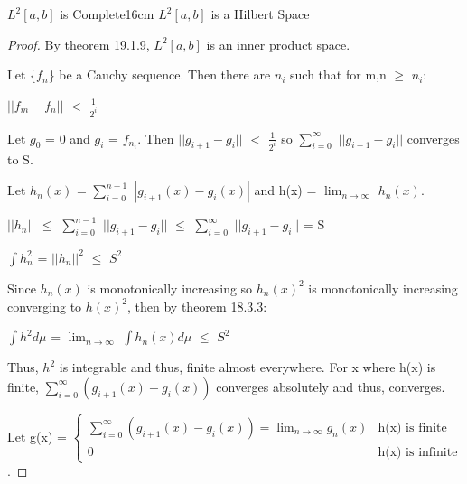     \newpage



    \begin{wtheorem}{$L^2[a,b]$ is Complete}{16cm}
        $L^2[a,b]$ is a Hilbert Space
    \end{wtheorem}

    \begin{proof}
        By {\color{red} theorem 19.1.9}, $L^2[a,b]$ is an inner product space.

        Let \{$f_n$\} be a Cauchy sequence.
        Then there are $n_i$ such that for m,n $\geq$ $n_i$:

        \hspace{0.5cm}
        $||f_m - f_n||$ $<$ $\frac{1}{2^i}$

        Let $g_0$ = 0 and $g_i$ = $f_{n_i}$.
        Then $||g_{i+1} - g_i||$ $<$ $\frac{1}{2^i}$
        so $\sum_{i=0}^{\infty}$ $||g_{i+1} - g_i||$ converges to S.

        Let $h_n(x)$ = $\sum_{i=0}^{n-1}$ $|g_{i+1}(x) - g_i(x)|$
        and h(x) = $\lim_{n \rightarrow \infty}$ $h_n(x)$.

        \hspace{0.5cm}
        $||h_n||$
        $\leq$ $\sum_{i=0}^{n-1}$ $||g_{i+1} - g_i||$
        $\leq$ $\sum_{i=0}^{\infty}$ $||g_{i+1} - g_i||$
        = S

        \hspace{0.5cm}
        $\int h_n^2$ = $||h_n||^2$ $\leq$ $S^2$

        Since $h_n(x)$ is monotonically increasing
        so $h_n(x)^2$ is monotonically increasing converging to $h(x)^2$,
        then by {\color{red} theorem 18.3.3}:

        \hspace{0.5cm}
        $\int h^2 d\mu$ = $\lim_{n \rightarrow \infty}$ $\int h_n(x) d\mu$
        $\leq$ $S^2$

        Thus, $h^2$ is integrable and thus, finite almost everywhere.
        For x where h(x) is finite, $\sum_{i=0}^{\infty} (g_{i+1}(x) - g_i(x))$
        converges absolutely and thus, converges.
        
        Let g(x) =
        $\begin{cases}
            \sum_{i=0}^{\infty} (g_{i+1}(x) - g_i(x))
                = \lim_{n \rightarrow \infty} g_n(x) & \text{h(x) is finite} \\
            0 & \text{h(x) is infinite}
        \end{cases}$.


\end{proof}
